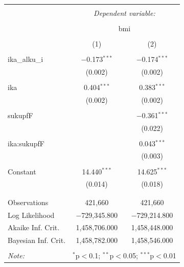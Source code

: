 \documentclass[finnish]{docopts}
\begin{document}
\begin{table}[!htbp] \centering 
  \caption{} 
  \label{} 
\begin{tabular}{@{\extracolsep{5pt}}lcc} 
\\[-1.8ex]\hline 
\hline \\[-1.8ex] 
 & \multicolumn{2}{c}{\textit{Dependent variable:}} \\ 
\cline{2-3} 
\\[-1.8ex] & \multicolumn{2}{c}{bmi} \\ 
\\[-1.8ex] & (1) & (2)\\ 
\hline \\[-1.8ex] 
 ika\_alku\_i & $-$0.173$^{***}$ & $-$0.174$^{***}$ \\ 
  & (0.002) & (0.002) \\ 
  & & \\ 
 ika & 0.404$^{***}$ & 0.383$^{***}$ \\ 
  & (0.002) & (0.002) \\ 
  & & \\ 
 sukupfF &  & $-$0.361$^{***}$ \\ 
  &  & (0.022) \\ 
  & & \\ 
 ika:sukupfF &  & 0.043$^{***}$ \\ 
  &  & (0.003) \\ 
  & & \\ 
 Constant & 14.440$^{***}$ & 14.625$^{***}$ \\ 
  & (0.014) & (0.018) \\ 
  & & \\ 
\hline \\[-1.8ex] 
Observations & 421,660 & 421,660 \\ 
Log Likelihood & $-$729,345.800 & $-$729,214.800 \\ 
Akaike Inf. Crit. & 1,458,706.000 & 1,458,448.000 \\ 
Bayesian Inf. Crit. & 1,458,782.000 & 1,458,546.000 \\ 
\hline 
\hline \\[-1.8ex] 
\textit{Note:}  & \multicolumn{2}{r}{$^{*}$p$<$0.1; $^{**}$p$<$0.05; $^{***}$p$<$0.01} \\ 
\end{tabular} 
\end{table} 
\end{document}
